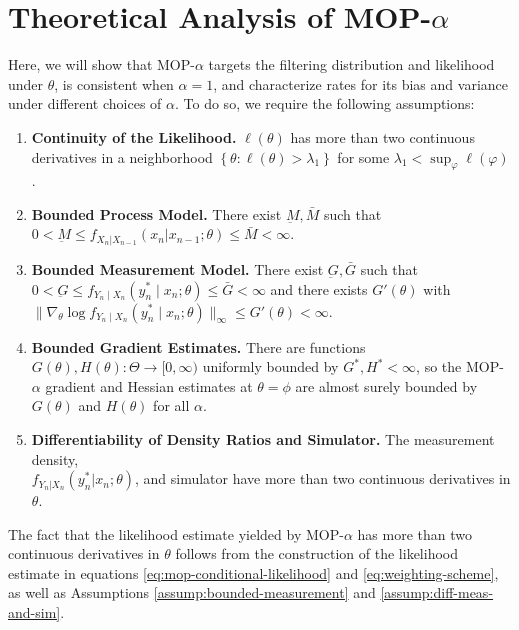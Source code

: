 \documentclass[11pt]{article}
\newcommand\arxiv[2]{#1} %
\begin{document}
\section{Theoretical Analysis of MOP-$\alpha$}
\label{sec:thms}

Here, we will show that MOP-$\alpha$ targets the filtering distribution and likelihood under $\theta$, is consistent when $\alpha=1$, and characterize rates for its bias and variance under different choices of $\alpha$. To do so, we require the following assumptions:

\begin{enumerate}[label=(A\arabic*),itemsep=-1.2ex] 
    \item \textbf{Continuity of the Likelihood.} $\ell(\theta)$ has more than two continuous derivatives in a neighborhood $\left\{\theta: \ell(\theta)>\lambda_1\right\}$ for some $\lambda_1<\sup _{\varphi} \ell(\varphi)$. \label{assump:conti-lik}
    \item \textbf{Bounded Process Model.} There exist $\underbar{M}, \bar{M}$ such that $0 < \underbar{M} \leq f_{X_n|X_{n-1}}(x_n | x_{n-1};\theta) \leq \bar{M} < \infty$. \label{assump:bounded-process}
    \item \textbf{Bounded Measurement Model.} There exist $\underbar{G}, \bar{G}$ such that $0<\underbar{G} \leq f_{Y_n \mid X_n}\left(y_n^* \mid x_n; \theta\right) \leq \bar{G}<\infty$ and there exists $G'(\theta)$ with $\|\nabla_\theta \log f_{Y_n \mid X_n}\left(y_n^* \mid x_n; \theta\right)\|_\infty \leq G'(\theta)< \infty$. \label{assump:bounded-measurement}
    \item \textbf{Bounded Gradient Estimates.} There are functions $G(\theta), H(\theta): \Theta \to [0,\infty)$ uniformly bounded by $G^*, H^*<\infty$, so the MOP-$\alpha$ gradient and Hessian estimates at $\theta=\phi$ are almost surely bounded by $G(\theta)$ and $H(\theta)$ for all $\alpha$. \label{assump:local-bounded-derivative}
    \item \textbf{Differentiability of Density Ratios and Simulator.} The measurement density, \arxiv{\\}{}$f_{Y_n|X_n}(y_n^*|x_n; \theta)$, and simulator have more than two continuous derivatives in $\theta$. \label{assump:diff-meas-and-sim}
\end{enumerate}

The fact that the likelihood estimate yielded by MOP-$\alpha$ has more than two continuous derivatives in $\theta$ follows from the construction of the likelihood estimate in equations \ref{eq:mop-conditional-likelihood} and \ref{eq:weighting-scheme}, as well as Assumptions \ref{assump:bounded-measurement} and \ref{assump:diff-meas-and-sim}. 
\end{document}
